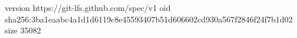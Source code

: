 version https://git-lfs.github.com/spec/v1
oid sha256:3ba1eaabc4a1d1d6119c8e45593407b51d606602cd930a567f2846f24f7b1d02
size 35082
